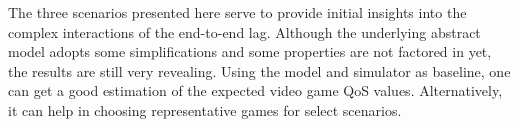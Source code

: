 The three scenarios presented here serve to provide initial insights into the complex interactions of the end-to-end lag. Although the underlying abstract model adopts some simplifications and some properties are not factored in yet, the results are still very revealing.
Using the model and simulator as baseline, one can get a good estimation of the expected video game \gls{QoS} values. Alternatively, it can help in choosing representative games for select scenarios.











